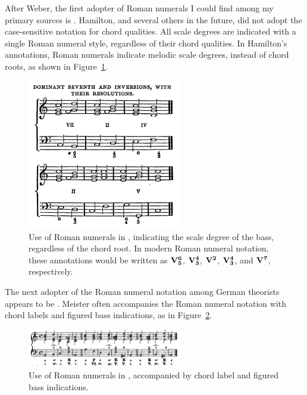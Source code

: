After Weber, the first adopter of Roman numerals I could find among my primary sources is \textcite{hamilton1840catechism}.
Hamilton, and several others in the future, did not adopt the case-sensitive notation for chord qualities.
All scale degrees are indicated with a single Roman numeral style, regardless of their chord qualities.
In Hamilton's annotations, Roman numerals indicate melodic scale degrees, instead of chord roots, as shown in Figure~\ref{fig:hamilton1840cathecism044}.

\begin{figure}[h!]
    \centering
    \includegraphics[width=0.6\textwidth]{figures/chapter/2/primary_sources/hamilton1840cathecism044.png}
    \caption{Use of Roman numerals in \textcite{hamilton1840catechism}, indicating the scale degree of the bass, regardless of the chord root. In modern Roman numeral notation, these annotations would be written as $\textbf{V}\relax\relax{\footnotesize {}^\textbf{6}\relax_\textbf{5}\relax\relax}$, $\textbf{V}\relax\relax{\footnotesize {}^\textbf{4}\relax_\textbf{3}\relax\relax}$, $\textbf{V}\relax\relax{\footnotesize {}^\textbf{2}\relax\relax}$, $\textbf{V}\relax\relax{\footnotesize {}^\textbf{4}\relax_\textbf{3}\relax\relax}$, and $\textbf{V}\relax\relax{\footnotesize {}^\textbf{7}\relax\relax}$, respectively.}
    \label{fig:hamilton1840cathecism044}
\end{figure}

The next adopter of the Roman numeral notation among German theorists appears to be \textcite{meister1852vollstandige}.
Meister often accompanies the Roman numeral notation with chord labels and figured bass indications, as in Figure~\ref{fig:meister1852vollstandige32}.

\begin{figure}[h!]
    \centering
    \includegraphics[width=0.6\textwidth]{figures/chapter/2/primary_sources/meister1852vollstandige32.png}
    \caption{Use of Roman numerals in \textcite{meister1852vollstandige}, accompanied by chord label and figured bass indications.}
    \label{fig:meister1852vollstandige32}
\end{figure}

